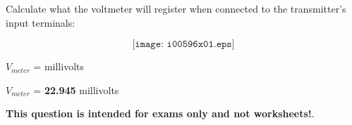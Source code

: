 

Calculate what the voltmeter will register when connected to the transmitter's input terminals:

$$\texttt{[image: i00596x01.eps]}$$

$V_{meter}$ = \underbar{\hskip 50pt} millivolts







$V_{meter}$ = {\bf 22.945} millivolts







{\bf This question is intended for exams only and not worksheets!}.


